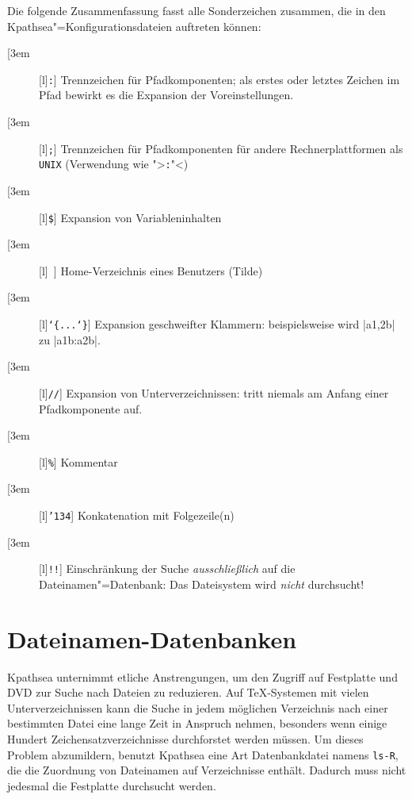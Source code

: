 \documentclass[12pt,ngerman,a4paper,fullparskip]{report}
\newcommand{\acro}[1]{\texttt{#1}}
\newcommand{\code}[1]{\texttt{#1}}
\newcommand{\file}[1]{\texttt{#1}}
\newcommand{\KPS}{Kpathsea\xspace}
\newcommand{\bs}{\protect\normalfont\ttfamily\char'134}
\begin{document}
Die folgende Zusammenfassung fasst alle Sonderzeichen zusammen, die in den
\KPS"=Konfigurationsdateien auftreten können:

\newcommand{\CODE}[1]{\makebox[3em][l]{\code{#1}}}

\begin{description}
\item[\CODE{:}]  Trennzeichen für Pfadkomponenten; als erstes
                    oder letztes Zeichen im Pfad bewirkt es die
                    Expansion der Voreinstellungen.
\item[\CODE{;}]  Trennzeichen für Pfadkomponenten für andere
                    Rechnerplattformen als \acro{UNIX} (Verwendung wie
      ">\code{:}"<)
\item[\CODE{\$}]    Expansion von Variableninhalten
\item[\CODE{\string~}]   Home-Verzeichnis eines Benutzers (Tilde)
\item[\CODE{\char`\{...\char`\}}] Expansion geschweifter Klammern:
                    beispielsweise wird |a{1,2}b| zu |a1b:a2b|.
\item[\CODE{//}]    Expansion von Unterverzeichnissen: tritt niemals
                    am Anfang einer Pfadkomponente auf.
\item[\CODE{\%}]    Kommentar
\item[\CODE{\bs}]   Konkatenation mit Folgezeile(n)
\item[\CODE{!!}]    Einschränkung der Suche \emph{ausschließlich} auf die
                    Dateinamen"=Datenbank: Das Dateisystem wird \emph{nicht}
                    durchsucht!
\end{description}



\section{Dateinamen-Datenbanken}\label{sec:filename-database}

\KPS unternimmt etliche Anstrengungen, um den Zugriff auf Festplatte und
DVD zur Suche nach Dateien zu reduzieren. Auf \TeX-Systemen mit vielen Unterverzeichnissen kann die Suche in jedem möglichen Verzeichnis nach einer bestimmten Datei eine lange Zeit in Anspruch nehmen, besonders wenn einige Hundert Zeichensatzverzeichnisse durchforstet werden müssen. Um dieses Problem abzumildern, benutzt {\KPS} eine Art Datenbankdatei namens \file{ls-R}, die die Zuordnung von Dateinamen auf Verzeichnisse enthält. Dadurch muss nicht jedesmal die Festplatte durchsucht werden.
\end{document}
